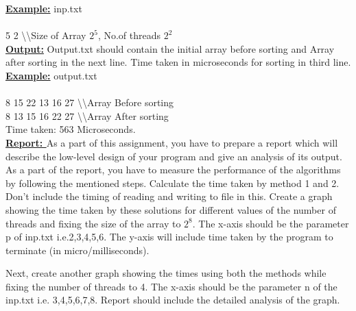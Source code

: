 \documentclass{article}
\begin{document}
\noindent\textbf{\underline {Example:}} inp.txt\\\\
5 2     \hspace{5 mm}          \textbackslash \textbackslash Size of Array $2^5$, No.of threads $2^2$\\

\noindent\textbf{\underline {Output:}} Output.txt should contain the initial array before sorting and Array after sorting in the next line. Time taken in microseconds for sorting in third line.\\


\noindent\textbf{\underline {Example:}} output.txt\\\\
8 15 22 13 16 27  \hspace{5 mm}          \textbackslash \textbackslash Array Before sorting\\
8 13 15 16 22 27  \hspace{5 mm}          \textbackslash \textbackslash Array After sorting\\
Time taken: 563 Microseconds.\\


\noindent\textbf{\underline {Report: }} As a part of this assignment, you have to prepare a report which will describe the low-level design of your program and give an analysis of its output. As a part of the report, you have to measure the performance of the algorithms by following the mentioned steps. Calculate the time taken by method 1 and 2. Don't include the timing of reading and writing to file in this. Create a graph showing the time taken by these solutions for different values of the number of threads and fixing the size of the array to $2^8$. The x-axis should be the parameter p of inp.txt i.e.2,3,4,5,6. The y-axis will include time taken by the program to terminate (in micro/milliseconds). 

Next, create another graph showing the times using both the methods while fixing the number of threads to 4. The x-axis should be the parameter n of the inp.txt i.e. 3,4,5,6,7,8. Report should include the detailed analysis of the graph.  \\\\\
\end{document}
